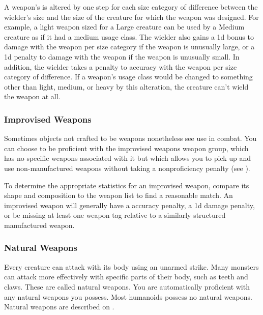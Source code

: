                 \label{Inappropriately Sized Weapons} A weapon's  is altered by one step for each size category of difference between the wielder's size and the size of the creature for which the weapon was designed.
                For example, a light weapon sized for a Large creature can be used by a Medium creature as if it had a medium usage class.
                The wielder also gains a \plus1d bonus to damage with the weapon per size category if the weapon is unusually large, or a \minus1d penalty to damage with the weapon if the weapon is unusually small.
                In addition, the wielder takes a  penalty to accuracy with the weapon per size category of difference.
                If a weapon's usage class would be changed to something other than light, medium, or heavy by this alteration, the creature can't wield the weapon at all.

        \subsubsection{Improvised Weapons}\label{Improvised Weapons}
            Sometimes objects not crafted to be weapons nonetheless see use in combat.
            You can choose to be proficient with the improvised weapons weapon group, which has no specific weapons associated with it but which allows you to pick up and use non-manufactured weapons without taking a nonproficiency penalty (see ).

            To determine the appropriate statistics for an improvised weapon, compare its shape and composition to the weapon list to find a reasonable match.
            An improvised weapon will generally have a  accuracy penalty, a \minus1d damage penalty, or be missing at least one weapon tag relative to a similarly structured manufactured weapon.

        \subsubsection{Natural Weapons}\label{Natural Weapons}
            Every creature can attack with its body using an unarmed strike. Many monsters can attack more effectively with specific parts of their body, such as teeth and claws. These are called natural weapons. You are automatically proficient with any natural weapons you possess. Most humanoids possess no natural weapons. Natural weapons are described on .

